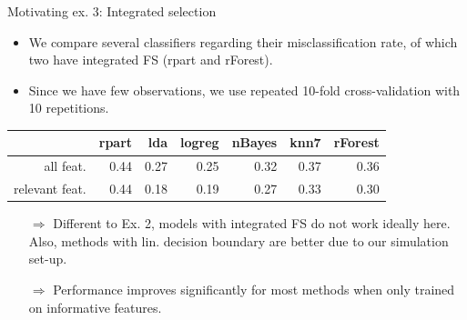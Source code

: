 \documentclass[11pt,compress,t,notes=noshow, xcolor=table]{beamer}
\begin{document}
\begin{vbframe}{Motivating ex. 3: Integrated selection}
  \begin{itemize}
  \setlength{\itemsep}{1.1em}
  \item We compare several classifiers regarding their misclassification rate, of which two have integrated FS (rpart and rForest).
  \item Since we have few observations, we use repeated 10-fold cross-validation with 10 repetitions.
  \end{itemize}
  \vspace{0.2cm}
  \begin{table}[ht]
    \begin{center}
      \begin{tabular}{rrrrrrr}
        \hline
        & rpart & lda & logreg & nBayes & knn7  & rForest \\
        \hline
        all feat. & 0.44 & 0.27 & 0.25 & 0.32 & 0.37 & 0.36 \\
        relevant feat. & 0.44 & 0.18 & 0.19 & 0.27 & 0.33 & 0.30 \\
        \hline
      \end{tabular}
    \end{center}
  \end{table}
\vspace{0.1cm}
\begin{itemize}
\setlength{\itemsep}{0.8em}
    \item[$\Rightarrow$] Different to Ex. 2, models with integrated FS do not work ideally here. Also, methods with lin. decision boundary are better due to our simulation set-up.
    \item[$\Rightarrow$]   Performance improves significantly for most methods when only trained on informative features.
\end{itemize}

\end{vbframe}

  \endlecture
\end{document}
